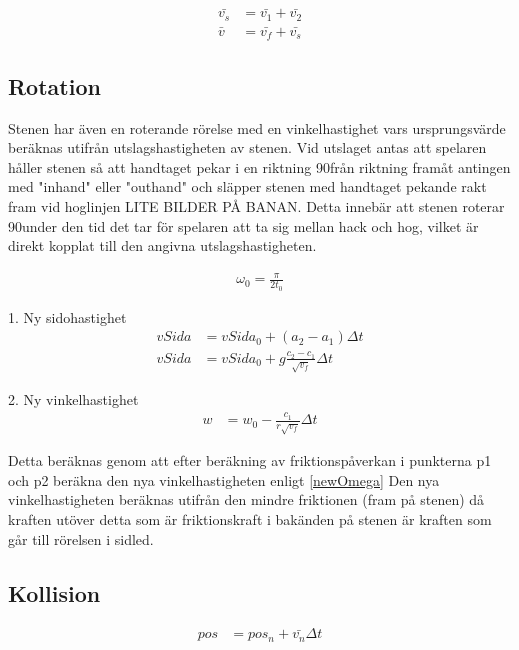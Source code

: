 \documentclass[11pt]{article} %
\begin{document}
 \begin{align}\label{vtot}
 \bar{v_s}& = \bar{v_1}+\bar{v_2}\\
 \bar{v}&=\bar{v_f}+\bar{v_s}
 \end{align}

\subsection{Rotation}


Stenen har även en roterande rörelse med en vinkelhastighet vars ursprungsvärde beräknas utifrån utslagshastigheten av stenen.
Vid utslaget antas att spelaren håller stenen så att handtaget pekar i en riktning 90\textdegree  från riktning framåt antingen med "inhand" eller "outhand" och släpper stenen med handtaget pekande rakt fram vid hoglinjen LITE BILDER PÅ BANAN. Detta innebär att stenen roterar 90\textdegree under den tid det tar för spelaren att ta sig mellan hack och hog, vilket är direkt kopplat till den angivna utslagshastigheten. 

\begin{align}%
 \omega_0 = \frac{\pi}{2 t_0} 
 \end{align}

1. Ny sidohastighet
 \begin{align}\label{vtot}
vSida& = vSida_0 + (a_2-a_1) \Delta t\\
vSida& = vSida_0 + g \frac{c_2-c_1}{\sqrt{v_f}} \Delta t
 \end{align}

2. Ny vinkelhastighet
 \begin{align}\label{vtot}
w& = w_0 - \frac{c_1}{r \sqrt{v_f}} \Delta t
 \end{align}

 Detta beräknas genom att efter beräkning av friktionspåverkan i punkterna p1 och p2 beräkna den nya vinkelhastigheten enligt \eqref{newOmega}
Den nya vinkelhastigheten beräknas utifrån den mindre friktionen (fram på stenen) då kraften utöver detta som är friktionskraft i bakänden på stenen är kraften som går till rörelsen i sidled. 
 

\subsection{Kollision}


 \begin{align} %
 pos&=pos_n+\bar{v_n}\Delta t \\  %
 \end{align}
\end{document}
